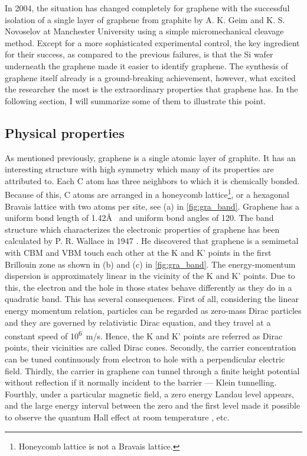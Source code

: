 In 2004, the situation has changed completely for graphene with the successful isolation of a single layer of graphene from graphite by A. K. Geim and K. S. Novoselov at Manchester University using a simple micromechanical cleavage method. Except for a more sophisticated experimental control, the key ingredient for their success, as compared to the previous failures\cite{Krishnan1997,Ohashi1997}, is that the Si wafer underneath the graphene made it easier to identify graphene\cite{Geim2007}. The synthesis of graphene itself already is a ground-breaking achievement, however, what excited the researcher the most is the extraordinary properties that graphene has. In the following section, I will summarize some of them to illustrate this point.

\subsection{Physical properties}

As mentioned previously, graphene is a single atomic layer of graphite. It has an interesting structure with high symmetry which many of its properties are attributed to. Each C atom has three neighbors to which it is chemically bonded. Because of this, C atoms are arranged in a honeycomb lattice\footnote{Honeycomb lattice is not a Bravais lattice.}, or a hexagonal Bravais lattice with two atoms per site, see (a) in \autoref{fig:gra_band}. Graphene has a uniform bond length of 1.42\AA~ and uniform bond angles of 120\textdegree. The band structure which characterizes the electronic properties of graphene has been calculated by P. R. Wallace in 1947 \cite{Wallace1947}. He discovered that graphene is a semimetal with CBM and VBM touch each other at the K and K' points in the first Brillouin zone as shown in (b) and (c) in \autoref{fig:gra_band}. The energy-momentum dispersion is approximately linear in the vicinity of the K and K' points. Due to this, the electron and the hole in those states behave differently as they do in a quadratic band. This has several consequences. First of all, considering the linear energy momentum relation, particles can be regarded as zero-mass Dirac particles and they are governed by relativistic Dirac equation\cite{Novoselov2005}, and they travel at a constant speed of \si{10^6m/s}. Hence, the K and K' points are referred as Dirac points, their vicinities are called Dirac cones. Secondly, the carrier concentration can be tuned continuously from electron to hole with a perpendicular electric field\cite{Geim2007}. Thirdly, the carrier in graphene can tunnel through a finite height potential without reflection if it normally incident to the barrier — Klein tunnelling\cite{Katsnelson2006}. Fourthly, under a particular magnetic field, a zero energy Landau level appears, and the large energy interval between the zero and the first level made it possible to observe the quantum Hall effect at room temperature \cite{Novoselov1379}, etc.

